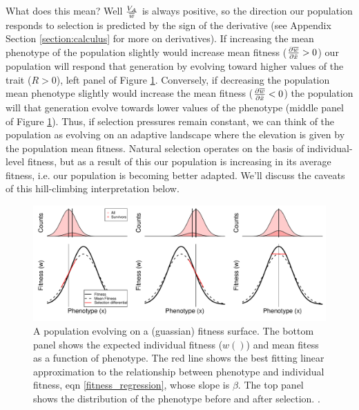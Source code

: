 What does this mean? Well $\frac{V_A}{\overline{w}}$ is always positive,
so the direction our population responds to selection is
predicted by the sign of the derivative (see Appendix Section
\ref{section:calculus} for more on derivatives). If increasing the mean
phenotype of the population slightly would 
increase mean fitness ($ \frac{\partial \overline{w}}{\partial \bar{x}}
>0$) our population will respond that generation by evolving toward
higher values of the trait ($R>0$), left panel of Figure \ref{fig:fitness_landscape_1D_w_wbar}. Conversely, if decreasing the
population mean phenotype slightly would increase the mean fitness ($ \frac{\partial \overline{w}}{\partial \bar{x}}
<0$) the population will that generation evolve towards lower values
of the phenotype  (middle panel of Figure
\ref{fig:fitness_landscape_1D_w_wbar}). Thus, if selection pressures
remain constant, we can think of the population as evolving on
an adaptive landscape where the elevation is given by the population mean
fitness. Natural selection operates on the basis of individual-level
fitness, but as a result of this our population is increasing in its
average fitness, i.e. our population is becoming better adapted. We'll
discuss the caveats of this hill-climbing interpretation below.

 \begin{figure}
 \begin{center}
 \includegraphics[width= 0.8 \textwidth]{figures/Response_to_sel/fitness_landscape_1D_w_wbar.pdf}
 \end{center}
 \caption{A population evolving on a (guassian) fitness surface. The
   bottom panel shows the expected individual fitness ($w()$) and mean
   fitess as a function of phenotype. The red line shows the best
   fitting linear approximation to the relationship between phenotype
   and individual fitness, eqn \eqref{fitness_regression}, whose slope is
   $\beta$. The top panel shows the distribution of the phenotype
   before and after selection. .} \label{fig:fitness_landscape_1D_w_wbar}  
 \end{figure}
 

